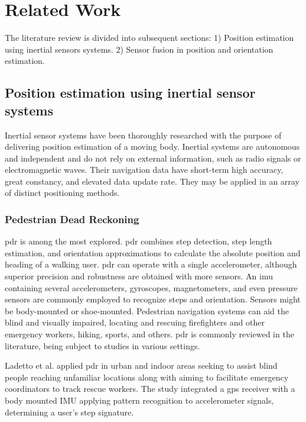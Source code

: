 \section{Related Work}
The literature review is divided into subsequent sections: 1) Position estimation using inertial sensors systems. 2) Sensor fusion in position and orientation estimation.

\subsection{Position estimation using inertial sensor systems}

Inertial sensor systems have been thoroughly researched with the purpose of delivering position estimation of a moving body. Inertial systems are autonomous and independent and do not rely on external information, such as radio signals or electromagnetic waves. Their navigation data have short-term high accuracy, great constancy, and elevated data update rate. They may be applied in an array of distinct positioning methods.

\subsubsection{Pedestrian Dead Reckoning}

\acrfull{pdr} is among the most explored. \acrshort{pdr} combines step detection, step length estimation, and orientation approximations to calculate the absolute position and heading of a walking user. \acrshort{pdr} can operate with a single accelerometer, although superior precision and robustness are obtained with more sensors. An \acrshort{imu} containing several accelerometers, gyroscopes, magnetometers, and even pressure sensors are commonly employed to recognize steps and orientation. Sensors might be body-mounted or shoe-mounted. Pedestrian navigation systems can aid the blind and visually impaired, locating and rescuing firefighters and other emergency workers, hiking, sports, and others. \acrshort{pdr} is commonly reviewed in the literature, being subject to studies in various settings.

Ladetto et al. \cite{ladetto2002step} applied \acrshort{pdr} in urban and indoor areas seeking to assist blind people reaching unfamiliar locations along with aiming to facilitate emergency coordinators to track rescue workers. The study integrated a \acrshort{gps} receiver with a body mounted IMU applying pattern recognition to accelerometer signals, determining a user's step signature.

